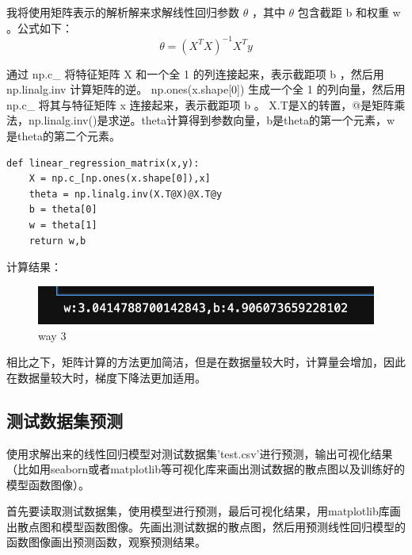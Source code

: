 \documentclass[12pt,a4paper,oneside]{article}
\begin{document}
我将使用矩阵表示的解析解来求解线性回归参数  $\theta$ ，其中  $\theta$  包含截距  b  和权重  w 。公式如下：
\begin{equation}
    \theta = (X^T X)^{-1} X^T y
\end{equation}

通过 np.c\_ 将特征矩阵  X  和一个全 1 的列连接起来，表示截距项  b ，然后用 np.linalg.inv 计算矩阵的逆。
np.ones(x.shape[0]) 生成一个全 1 的列向量，然后用 np.c\_ 将其与特征矩阵  x  连接起来，表示截距项  b 。
X.T是X的转置，@是矩阵乘法，np.linalg.inv()是求逆。theta计算得到参数向量，b是theta的第一个元素，w是theta的第二个元素。
\begin{lstlisting}    
def linear_regression_matrix(x,y):
    X = np.c_[np.ones(x.shape[0]),x]
    theta = np.linalg.inv(X.T@X)@X.T@y
    b = theta[0]
    w = theta[1]
    return w,b
\end{lstlisting}
计算结果：
\begin{figure}[H]
    \centering
    \begin{minipage}[b]{0.5\textwidth}
        \centering
        \includegraphics[width=\textwidth]{3}
        \caption{way 3}
        \label{fig:code}
    \end{minipage}
\end{figure}

相比之下，矩阵计算的方法更加简洁，但是在数据量较大时，计算量会增加，因此在数据量较大时，梯度下降法更加适用。
\subsection{测试数据集预测}
使用求解出来的线性回归模型对测试数据集'test.csv'进行预测，输出可视化结果（比如用seaborn或者matplotlib等可视化库来画出测试数据的散点图以及训练好的模型函数图像）。

首先要读取测试数据集，使用模型进行预测，最后可视化结果，用matplotlib库画出散点图和模型函数图像。先画出测试数据的散点图，然后用预测线性回归模型的函数图像画出预测函数，观察预测结果。
\end{document}
